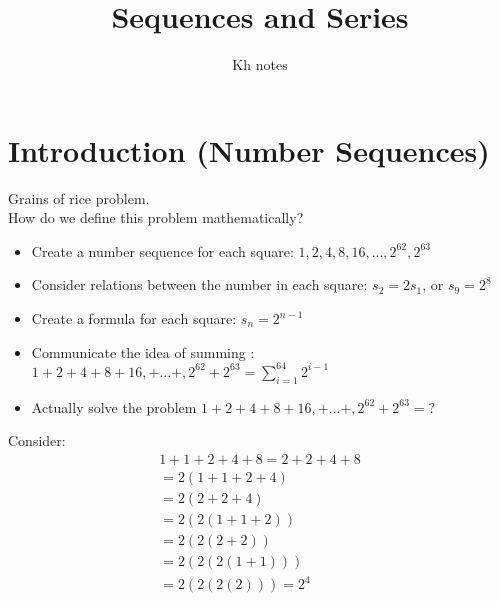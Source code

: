\documentclass[12pt]{article}
\title{Sequences and Series}
\author{Kh notes}
\date{}
\begin{document}
	\maketitle
\tableofcontents
\newpage
\section{Introduction (Number Sequences)}
\begin{center}
\end{center}
Grains of rice problem.\\
How do we define this problem mathematically?
\begin{itemize}
	\item Create a number sequence for each square: $1,2,4,8,16,..., 2^{62},  2^{63}$
	\item Consider relations between the number in each square: $s_2 = 2s_1$, or $s_9= 2^8$
	\item Create a formula for each square: $s_n = 2^{n-1}$
	\item Communicate the idea of summing : $\displaystyle 1+2+4+8+16,+...+, 2^{62}+2^{63} = \sum_{i=1}^{64} 2^{i-1}$
	\item Actually solve the problem  $1+2+4+8+16,+...+, 2^{62}+2^{63} = ?$
\end{itemize}
Consider:
\begin{align*}
	1+1+2+4+8 = 2+2+4+8\\
	=2(1+1+2+4)\\
		=2(2+2+4)\\
		=2(2(1+1+2))\\
		=2(2(2+2))\\
		=2(2(2(1+1)))\\
		=2(2(2(2)))
		=2^4
\end{align*}
\newpage
\end{document}
